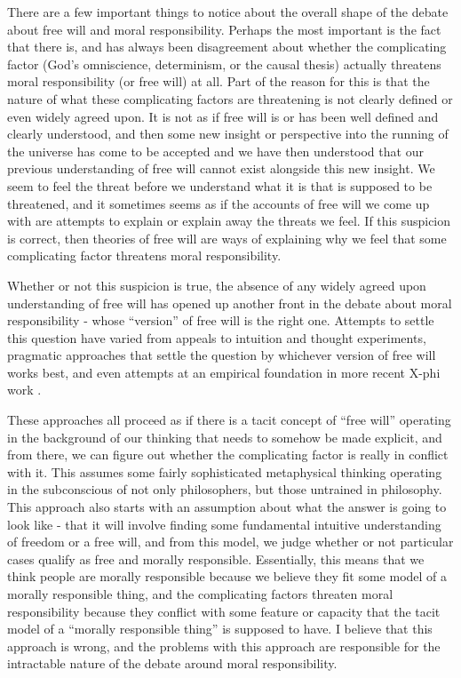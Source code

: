 \documentclass[phd,12pt,oneside,paper=letterpaper]{ubcthesis}
\begin{document}
There are a few important things to notice about the overall shape of the debate about free will and moral responsibility. Perhaps the most important is the fact that there is, and has always been disagreement about whether the complicating factor (God's omniscience, determinism, or the causal thesis) actually threatens moral responsibility (or free will) at all. Part of the reason for this is that the nature of what these complicating factors are threatening is not clearly defined or even widely agreed upon. It is not as if free will is or has been well defined and clearly understood, and then some new insight or perspective into the running of the universe has come to be accepted and we have then understood that our previous understanding of free will cannot exist alongside this new insight. We seem to feel the threat before we understand what it is that is supposed to be threatened, and it sometimes seems as if the accounts of free will we come up with are attempts to explain or explain away the threats we feel. If this suspicion is correct, then theories of free will are ways of explaining why we feel that some complicating factor threatens moral responsibility.

Whether or not this suspicion is true, the absence of any widely agreed upon understanding of free will has opened up another front in the debate about moral responsibility - whose ``version'' of free will is the right one. Attempts to settle this question have varied from appeals to intuition and thought experiments, pragmatic approaches that settle the question by whichever version of free will works best, and even attempts at an empirical foundation in more recent X-phi work \citep{nahmias2004}.

These approaches all proceed as if there is a tacit concept of ``free will'' operating in the background of our thinking that needs to somehow be made explicit, and from there, we can figure out whether the complicating factor is really in conflict with it. This assumes some fairly sophisticated metaphysical thinking operating in the subconscious of not only philosophers, but those untrained in philosophy. This approach also starts with an assumption about what the answer is going to look like - that it will involve finding some fundamental intuitive understanding of freedom or a free will, and from this model, we judge whether or not particular cases qualify as free and morally responsible. Essentially, this means that we think people are morally responsible because we believe they fit some model of a morally responsible thing, and the complicating factors threaten moral responsibility because they conflict with some feature or capacity that the tacit model of a ``morally responsible thing'' is supposed to have. I believe that this approach is wrong, and the problems with this approach are responsible for the intractable nature of the debate around moral responsibility. 
\end{document}
